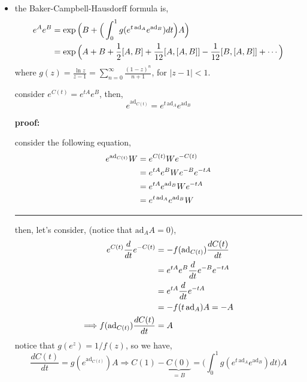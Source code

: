 \begin{itemize}
	\noindent\rule[0.5ex]{\linewidth}{0.5pt} %
	
	\item the Baker-Campbell-Hausdorff formula is,
	\begin{align}
		e^A e^B &= \exp \Big( B + \Big( \int_0^1 g(e^{t \, \mathrm{ad}_A} e^{\mathrm{ad}_B}) dt \Big) A \Big) \notag \\
		&= \exp \Big( A + B + \frac{1}{2} [A, B] + \frac{1}{12} [A, [A, B]] - \frac{1}{12} [B, [A, B]] + \cdots \Big)
	\end{align}
	where $g(z) = \frac{\ln z}{z - 1} = \sum_{n = 0}^\infty \frac{(1 - z)^n}{n + 1}$, for $|z - 1| < 1$.
	
	\begin{tcolorbox}[title=proof:]
		consider $e^{C(t)} = e^{t A} e^B$, then,
		\begin{equation}
			e^{\mathrm{ad}_{C(t)}} = e^{t \, \mathrm{ad}_A} e^{\mathrm{ad}_B}
		\end{equation}
		
		\noindent\hdashrule[0.5ex]{\linewidth}{0.5pt}{1mm} %
		
		\textbf{proof:}
		
		consider the following equation,
		\begin{align}
			e^{\mathrm{ad}_{C(t)}} W &= e^{C(t)} W e^{- C(t)} \notag \\
			&= e^{t A} e^B W e^{- B} e^{- t A} \notag \\
			&= e^{t A} e^{\mathrm{ad}_B} W e^{- t A} \notag \\
			&= e^{t \, \mathrm{ad}_A} e^{\mathrm{ad}_B} W
		\end{align}
		
		\noindent\rule[0.5ex]{\linewidth}{0.5pt} %
		
		then, let’s consider, (notice that $\mathrm{ad}_A A = 0$),
		\begin{align}
			e^{C(t)} \frac{d}{dt} e^{- C(t)} &= - f(\mathrm{ad}_{C(t)}) \frac{d C(t)}{dt} \notag \\
			&= e^{t A} e^B \frac{d}{dt} e^{- B} e^{- t A} \notag \\
			&= e^{t A} \frac{d}{dt} e^{- t A} \notag \\
			&= - f(t \, \mathrm{ad}_A) A = - A \\
			\Longrightarrow f(\mathrm{ad}_{C(t)}) \frac{d C(t)}{dt} &= A
		\end{align}
		notice that $g(e^z) = 1 / f(z)$, so we have,
		\begin{equation}
			\frac{d C(t)}{dt} = g(e^{\mathrm{ad}_{C(t)}}) A \Longrightarrow C(1) - \underbrace{C(0)}_{= B} = \Big( \int_0^1 g(e^{t \, \mathrm{ad}_A} e^{\mathrm{ad}_B}) dt \Big) A
		\end{equation}
	\end{tcolorbox}
\end{itemize}
